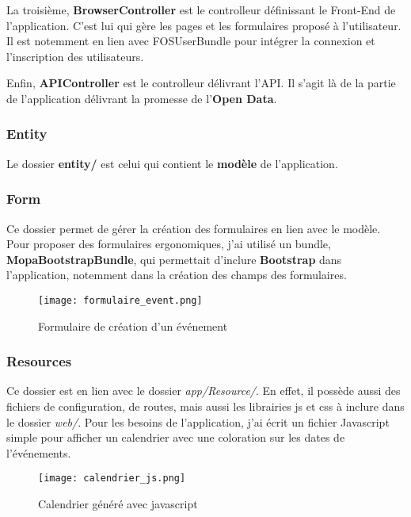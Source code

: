 La troisième, \textbf{BrowserController} est le controlleur définissant le Front-End de l'application. C'est lui qui gère les pages et les formulaires proposé à l'utilisateur. Il est notemment en lien avec FOSUserBundle pour intégrer la connexion et l'inscription des utilisateurs.

Enfin, \textbf{APIController} est le controlleur délivrant l'API. Il s'agit là de la partie de l'application délivrant la promesse de l'\textbf{Open Data}.

\subsubsection*{Entity}

Le dossier \textbf{entity/} est celui qui contient le \textbf{modèle} de l'application.


\subsubsection*{Form}

Ce dossier permet de gérer la création des formulaires en lien avec le modèle. Pour proposer des formulaires ergonomiques, j'ai utilisé un bundle, \textbf{MopaBootstrapBundle}, qui permettait d'inclure \textbf{Bootstrap} dans l'application, notemment dans la création des champs des formulaires.

\begin{figure}[h]
\begin{center}
\texttt{[image: formulaire\_event.png]}
\end{center}
\caption{Formulaire de création d'un événement}
\end{figure}

\subsubsection*{Resources}

Ce dossier est en lien avec le dossier \textit{app/Resource/}. En effet, il possède aussi des fichiers de configuration, de routes, mais aussi les librairies js et css à inclure dans le dossier \textit{web/}. Pour les besoins de l'application, j'ai écrit un fichier Javascript simple pour afficher un calendrier avec une coloration sur les dates de l'événements.

\begin{figure}[h]
\begin{center}
\texttt{[image: calendrier\_js.png]}
\end{center}
\caption{Calendrier généré avec javascript}
\end{figure}


